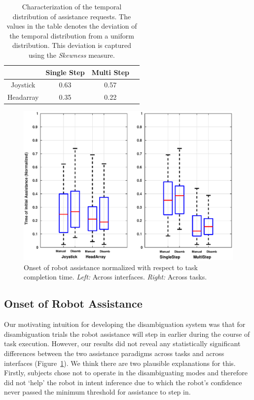 \begin{table}[t]
	\centering
	\begin{tabular}{|c|c|c|c|}
		\hline
		& Single Step & Multi Step \\
		\hline
		Joystick & 0.63 & 0.57 \\
		\hline
		Headarray & 0.35 & 0.22 \\
		\hline
	\end{tabular}
	\vspace{.2cm}
	\caption{Characterization of the temporal distribution of assistance requests. The values in the table denotes the deviation of the temporal distribution from a uniform distribution. This deviation is captured using the \textit{Skewness} measure. } 
	\label{table:skewness}
	\vspace{-.5cm}
\end{table}

\begin{figure}[ht!]
	\centering
	\includegraphics[width = 1\hsize ,center]{./figures/initial_blend.eps}
	\caption{Onset of robot assistance normalized with respect to task completion time. \textit{Left:} Across interfaces. \textit{Right:} Across tasks.}
	\label{fig:initial_blend}
\end{figure}
\subsection{Onset of Robot Assistance}\label{ssec:onset}
Our motivating intuition for developing the disambiguation system was that for disambiguation trials the robot assistance will step in earlier during the course of task execution. However, our results did not reveal any statistically significant differences between the two assistance paradigms across tasks and across interfaces (Figure~\ref{fig:initial_blend}). We think there are two plausible explanations for this. Firstly, subjects chose not to operate in the disambiguating modes and therefore did not `help' the robot in intent inference due to which the robot's confidence never passed the minimum threshold for assistance to step in. 

